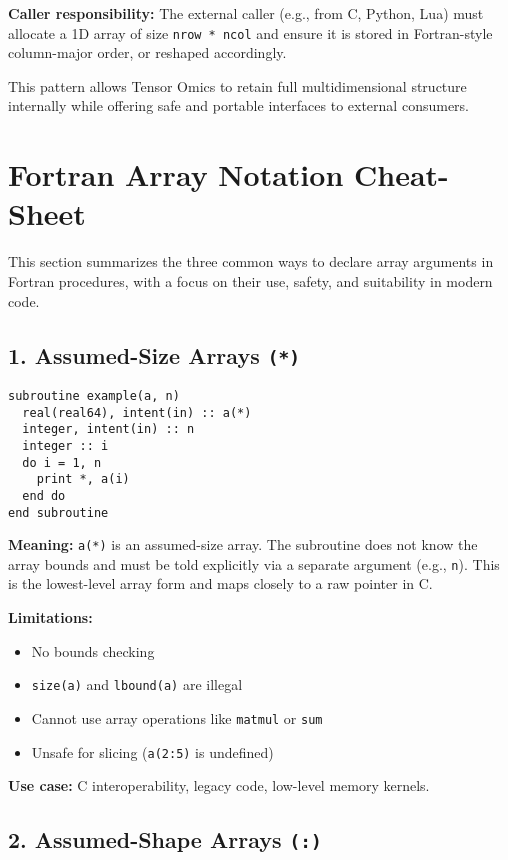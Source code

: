 \documentclass{article}
\begin{document}
\noindent\textbf{Caller responsibility:}
The external caller (e.g., from C, Python, Lua) must allocate a 1D array of size \texttt{nrow * ncol} and ensure it is stored in Fortran-style column-major order, or reshaped accordingly.

\noindent This pattern allows Tensor Omics to retain full multidimensional structure internally while offering safe and portable interfaces to external consumers.


\section{Fortran Array Notation Cheat-Sheet}

This section summarizes the three common ways to declare array arguments in Fortran procedures, with a focus on their use, safety, and suitability in modern code.

\subsection{1. Assumed-Size Arrays \texttt{(*)}}

\begin{verbatim}
subroutine example(a, n)
  real(real64), intent(in) :: a(*)
  integer, intent(in) :: n
  integer :: i
  do i = 1, n
    print *, a(i)
  end do
end subroutine
\end{verbatim}

\textbf{Meaning:} \texttt{a(*)} is an assumed-size array. The subroutine does not know the array bounds and must be told explicitly via a separate argument (e.g., \texttt{n}). This is the lowest-level array form and maps closely to a raw pointer in C.

\textbf{Limitations:}
\begin{itemize}
  \item No bounds checking
  \item \texttt{size(a)} and \texttt{lbound(a)} are illegal
  \item Cannot use array operations like \texttt{matmul} or \texttt{sum}
  \item Unsafe for slicing (\texttt{a(2:5)} is undefined)
\end{itemize}

\textbf{Use case:} C interoperability, legacy code, low-level memory kernels.


\subsection{2. Assumed-Shape Arrays \texttt{(:)}}
\end{document}
